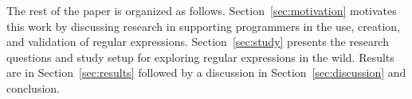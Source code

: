 The rest of the paper is organized as follows. Section~\ref{sec:motivation} motivates this work by discussing research in supporting programmers in the use, creation, and validation of regular expressions. Section~\ref{sec:study} presents the research questions and study setup for exploring regular expressions in the wild. Results are in Section~\ref{sec:results} followed by a discussion in Section~\ref{sec:discussion} and conclusion. 